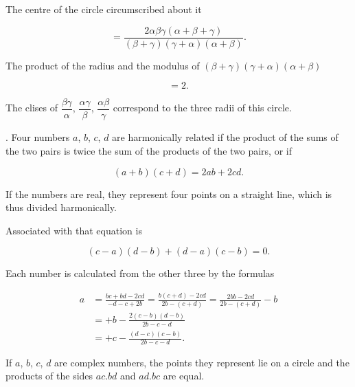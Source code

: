 
The centre of the circle circumscribed about it

\[
= \frac{2\alpha\beta\gamma(\alpha+\beta+\gamma)}{(\beta+\gamma)(\gamma+\alpha)(\alpha+\beta)}.
\]

The product of the radius and the modulus of $(\beta+\gamma)(\gamma+\alpha)(\alpha+\beta)$

\[
= 2.
\]

The clises of $\dfrac{\beta\gamma}{\alpha}$, $\dfrac{\alpha\gamma}{\beta}$, $\dfrac{\alpha\beta}{\gamma}$ correspond to the three radii of this circle.

\medskip
{}. Four numbers $a$, $b$, $c$, $d$ are harmonically related if the
product of the sums of the two pairs is twice the sum of the
products of the two pairs, or if

\[
(a+b)(c+d) = 2ab+2cd.
\]

If the numbers are real, they represent four points on a straight line,
which is thus divided harmonically.

Associated with that equation is

\[
(c-a)(d-b)+(d-a)(c-b) = 0.
\]

Each number is calculated from the other three by the formulas

\[
\begin{aligned}
a &= \frac{bc+bd-2cd}{-d-c+2b} = \frac{b(c+d)-2cd}{2b-(c+d)} = \frac{2bb-2cd}{2b-(c+d)}-b \\
  &= +b-\frac{2(c-b)(d-b)}{2b-c-d} \\
  &= +c-\frac{(d-c)(c-b)}{2b-c-d}.
\end{aligned}
\]

If $a$, $b$, $c$, $d$ are complex numbers, the points they represent lie
on a circle and the products of the sides $ac.bd$ and $ad.bc$ are equal.
